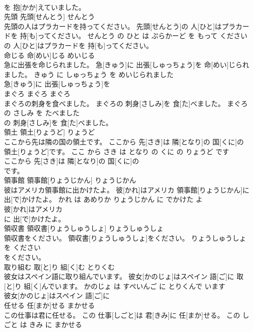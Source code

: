 \documentclass[8pt]{extreport}
\begin{document}
\begin{CJK}{UTF8}{min}
\\	を 抱[かか]えていました。			
\\	先頭	先頭[せんとう]	せんとう	
\\	先頭の人はプラカードを持ってください。	先頭[せんとう]の 人[ひと]はプラカードを 持[も]ってください。	せんとう の ひと は ぷらかーど を もって ください	
\\	の 人[ひと]はプラカードを 持[も]ってください。			
\\	命じる	命[めい]じる	めいじる	
\\	急に出張を命じられました。	急[きゅう]に 出張[しゅっちょう]を 命[めい]じられました。	きゅう に しゅっちょう を めいじられました	
\\	急[きゅう]に 出張[しゅっちょう]を
\\	まぐろ	まぐろ	まぐろ	
\\	まぐろの刺身を食べました。	まぐろの 刺身[さしみ]を 食[た]べました。	まぐろ の さしみ を たべました	
\\	の 刺身[さしみ]を 食[た]べました。			
\\	領土	領土[りょうど]	りょうど	
\\	ここから先は隣の国の領土です。	ここから 先[さき]は 隣[となり]の 国[くに]の 領土[りょうど]です。	ここ から さき は となり の くに の りょうど です	
\\	ここから 先[さき]は 隣[となり]の 国[くに]の
\\	です。			
\\	領事館	領事館[りょうじかん]	りょうじかん	
\\	彼はアメリカ領事館に出かけたよ。	彼[かれ]はアメリカ 領事館[りょうじかん]に 出[で]かけたよ。	かれ は あめりか りょうじかん に でかけた よ	
\\	彼[かれ]はアメリカ
\\	に 出[で]かけたよ。			
\\	領収書	領収書[りょうしゅうしょ]	りょうしゅうしょ	
\\	領収書をください。	領収書[りょうしゅうしょ]をください。	りょうしゅうしょ を ください	
\\	をください。			
\\	取り組む	取[と]り 組[く]む	とりくむ	
\\	彼女はスペイン語に取り組んでいます。	彼女[かのじょ]はスペイン 語[ご]に 取[と]り 組[く]んでいます。	かのじょ は すぺいんご に とりくんで います	
\\	彼女[かのじょ]はスペイン 語[ご]に
\\	任せる	任[まか]せる	まかせる	
\\	この仕事は君に任せる。	この 仕事[しごと]は 君[きみ]に 任[まか]せる。	この しごと は きみ に まかせる	

\end{CJK}
\end{document}

